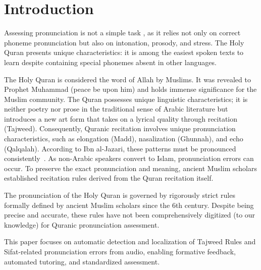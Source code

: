 \section{Introduction}
\noindent
Assessing pronunciation is not a simple task \cite{kheir2023automatic}, as it relies not only on correct phoneme pronunciation but also on intonation, prosody, and stress. The Holy Quran presents unique characteristics: it is among the easiest spoken texts to learn despite containing special phonemes absent in other languages.



The Holy Quran is considered the word of Allah by Muslims. It was revealed to Prophet Muhammad (peace be upon him) and holds immense significance for the Muslim community. The Quran possesses unique linguistic characteristics; it is neither poetry nor prose in the traditional sense of Arabic literature but introduces a new art form that takes on a lyrical quality through recitation (Tajweed). Consequently, Quranic recitation involves unique pronunciation characteristics, such as elongation (Madd), nasalization (Ghunnah), and echo (Qalqalah). According to Ibn al-Jazari, these patterns must be pronounced consistently~\cite{AlJazariyyahSwaid}. As non-Arabic speakers convert to Islam, pronunciation errors can occur. To preserve the exact pronunciation and meaning, ancient Muslim scholars established recitation rules derived from the Quran recitation itself.

The pronunciation of the Holy Quran is governed by rigorously strict rules formally defined by ancient Muslim scholars since the 6th century. Despite being precise and accurate, these rules have not been comprehensively digitized (to our knowledge) for Quranic pronunciation assessment.

This paper focuses on automatic detection and localization of Tajweed Rules and Sifat-related pronunciation errors from audio, enabling formative feedback, automated tutoring, and standardized assessment.

